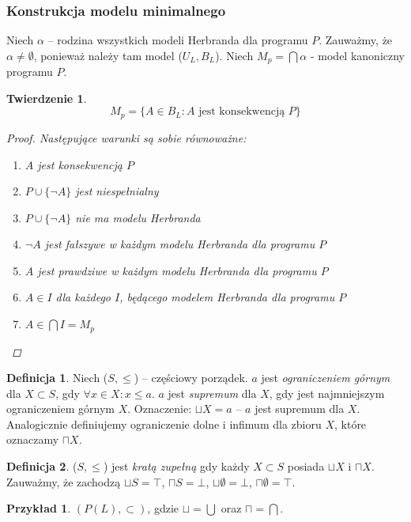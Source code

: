 \documentclass[10pt,a4paper]{article}
\theoremstyle{plain}
\newtheorem{theorem}{Twierdzenie}
\theoremstyle{definition}
\newtheorem*{definition}{Definicja}
\newtheorem*{example}{Przykład}
\begin{document}
\subsubsection{Konstrukcja modelu minimalnego}
Niech $\alpha$ -- rodzina wszystkich modeli Herbranda dla programu $P$. Zauważmy, że $\alpha \neq \emptyset$, ponieważ należy tam model
($U_L, B_L$). Niech $M_p = \bigcap \alpha$ - model kanoniczny programu $P$.

\begin{theorem}
\[ M_p = \lbrace A \in B_L : A \text{ jest konsekwencją } P \rbrace \]
\begin{proof}
Następujące warunki są sobie równoważne:
\begin{enumerate}
  \item $A$ jest konsekwencją $P$
  \item $P \cup \lbrace \lnot A \rbrace$ jest niespełnialny
  \item $P \cup \lbrace \lnot A \rbrace$ nie ma modelu Herbranda
  \item $\lnot A$ jest fałszywe w każdym modelu Herbranda dla programu $P$
  \item $A$ jest prawdziwe w każdym modelu Herbranda dla programu $P$
  \item $A \in I$ dla każdego $I$, będącego modelem Herbranda dla programu $P$
  \item $A \in \bigcap I = M_p$
\end{enumerate}
\end{proof}
\end{theorem}

\begin{definition}
Niech ($S, \leq$) -- częściowy porządek. $a$ jest \emph{ograniczeniem górnym} dla $X \subset S$, gdy $\forall x \in X : x \leq a$.
$a$ jest \emph{supremum} dla $X$, gdy jest najmniejszym ograniczeniem górnym $X$. Oznaczenie: $\sqcup X = a$ -- $a$ jest supremum dla $X$.
Analogicznie definiujemy ograniczenie dolne i infimum dla zbioru $X$, które oznaczamy $\sqcap X$.
\end{definition}

\begin{definition}
($S, \leq$) jest \emph{kratą zupełną} gdy każdy $X \subset S$ posiada $\sqcup X$ i $\sqcap X$.
Zauważmy, że zachodzą $\sqcup S = \top$, $\sqcap S = \bot$, $\sqcup \emptyset = \bot$, $\sqcap \emptyset = \top$.
\end{definition}

\begin{example}
$(P(L), \subset)$, gdzie $\sqcup = \bigcup$ oraz $\sqcap = \bigcap$.
\end{example}
\end{document}
